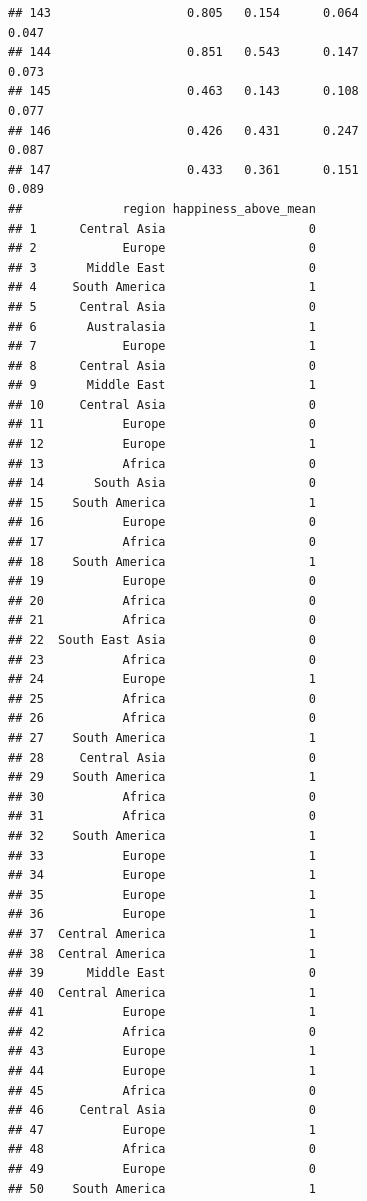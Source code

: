 \documentclass[]{article}
\begin{document}
\begin{verbatim}
## 143                   0.805   0.154      0.064                     0.047
## 144                   0.851   0.543      0.147                     0.073
## 145                   0.463   0.143      0.108                     0.077
## 146                   0.426   0.431      0.247                     0.087
## 147                   0.433   0.361      0.151                     0.089
##              region happiness_above_mean
## 1      Central Asia                    0
## 2            Europe                    0
## 3       Middle East                    0
## 4     South America                    1
## 5      Central Asia                    0
## 6       Australasia                    1
## 7            Europe                    1
## 8      Central Asia                    0
## 9       Middle East                    1
## 10     Central Asia                    0
## 11           Europe                    0
## 12           Europe                    1
## 13           Africa                    0
## 14       South Asia                    0
## 15    South America                    1
## 16           Europe                    0
## 17           Africa                    0
## 18    South America                    1
## 19           Europe                    0
## 20           Africa                    0
## 21           Africa                    0
## 22  South East Asia                    0
## 23           Africa                    0
## 24           Europe                    1
## 25           Africa                    0
## 26           Africa                    0
## 27    South America                    1
## 28     Central Asia                    0
## 29    South America                    1
## 30           Africa                    0
## 31           Africa                    0
## 32    South America                    1
## 33           Europe                    1
## 34           Europe                    1
## 35           Europe                    1
## 36           Europe                    1
## 37  Central America                    1
## 38  Central America                    1
## 39      Middle East                    0
## 40  Central America                    1
## 41           Europe                    1
## 42           Africa                    0
## 43           Europe                    1
## 44           Europe                    1
## 45           Africa                    0
## 46     Central Asia                    0
## 47           Europe                    1
## 48           Africa                    0
## 49           Europe                    0
## 50    South America                    1

\end{verbatim}
\end{document}
